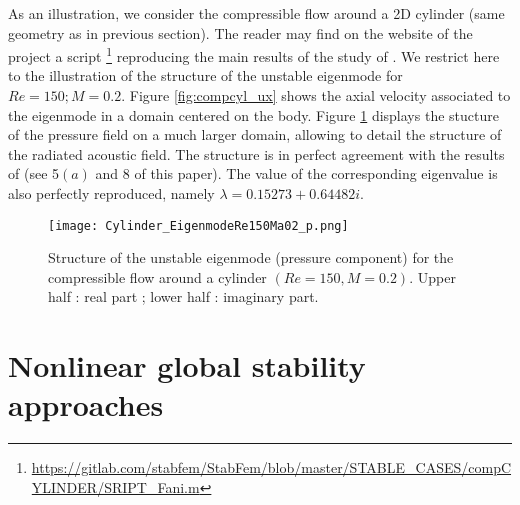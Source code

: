 \documentclass[twocolumn,10pt]{asme2ej}
\begin{document}
As an illustration, we consider the compressible flow around a 2D cylinder (same geometry as in previous section). The reader may find on the website of the project a script \footnote{ \url{https://gitlab.com/stabfem/StabFem/blob/master/STABLE_CASES/compCYLINDER/SRIPT_Fani.m}} reproducing the main results of the study of \cite{Fani2018}. We restrict here to the illustration of the structure of the unstable eigenmode for $Re = 150; M = 0.2$. Figure \ref{fig:compcyl_ux} shows the axial velocity associated to the eigenmode in a domain centered on the body. Figure \ref{fig:compcyl_p} displays the stucture of the pressure field on a much larger domain, allowing to detail the structure of the radiated acoustic field. The structure is in perfect agreement with the results of \cite{Fani2018} (see 5$(a)$ and $8$ of this paper). The value of the corresponding eigenvalue is also perfectly reproduced, namely $\lambda = 0.15273+0.64482i$.

 

 \begin{figure}
\texttt{[image: Cylinder\_EigenmodeRe150Ma02\_p.png]}
\caption{Structure of the unstable eigenmode (pressure component) for the compressible flow around a cylinder  $(Re= 150,M=0.2)$. Upper half : real part ; lower half : imaginary part. }
\label{fig:compcyl_p}
\end{figure}

\section{Nonlinear global stability approaches}
\vspace{.2cm}


\end{document}

